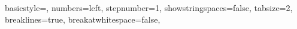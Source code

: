 \hypersetup{
	colorlinks=true,
	linkcolor=blue,
	filecolor=magenta,      
	urlcolor=red,
	citecolor=lime!50!black,
}


\geometry{a4paper, left=25mm, right=25mm, top=30mm, bottom=30mm}

\date{\today}
\lhead{\thedate}
\lhead{\thetitle}
\pagestyle{fancy}

\usetikzlibrary{patterns}
\usetikzlibrary{3d}

\author{Author 1\\(number)\\Mail-address \and Author 2\\(number)\\Mail-address}
\allowdisplaybreaks

\lstset
{ %
    basicstyle=\footnotesize,
    numbers=left,
    stepnumber=1,
    showstringspaces=false,
    tabsize=2,
    breaklines=true,
    breakatwhitespace=false,
}
